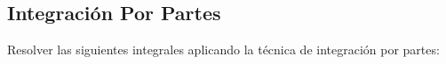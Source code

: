 \documentclass{article}
\begin{document}
\begin{multicols}{2}
\section*{Integración Por Partes}
Resolver las siguientes integrales aplicando la técnica de integración por partes:

\begin{enumerate}

\end{enumerate}
\end{multicols}
\end{document}
